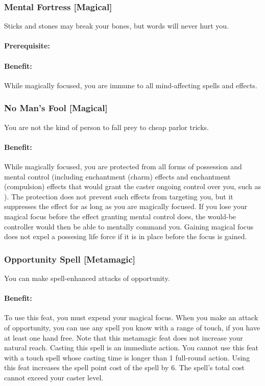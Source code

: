 \subsubsection[Mental Fortress]{Mental Fortress [Magical]}
\label{Feat:MentalFortress}
Sticks and stones may break your bones, but words will never hurt you.
\paragraph{Prerequisite:} 
\paragraph{Benefit:} While magically focused, you are immune to all mind-affecting spells and effects.
\subsubsection[No Man's Fool]{No Man's Fool [Magical]}
\label{Feat:NoMansFool}
You are not the kind of person to fall prey to cheap parlor tricks.
\paragraph{Benefit:} While magically focused, you are protected from all forms of possession and mental control (including enchantment (charm) effects and enchantment (compulsion) effects that would grant the caster ongoing control over you, such as ). 
The protection does not prevent such effects from targeting you, but it suppresses the effect for as long as you are magically focused. 
If you lose your magical focus before the effect granting mental control does, the would-be controller would then be able to mentally command you. 
Gaining magical focus does not expel a possesing life force if it is in place before the focus is gained. 
\subsubsection[Opportunity Spell]{Opportunity Spell [Metamagic]}
\label{Feat:OpportunitySpell}
You can make spell-enhanced attacks of opportunity.

\paragraph{Benefit:} To use this feat, you must expend your magical focus. 
When you make an attack of opportunity, you can use any spell you know with a range of touch, if you have at least one hand free.
Note that this metamagic feat does not increase your natural reach.
Casting this spell is an immediate action.
You cannot use this feat with a touch spell whose casting time is longer than 1 full-round action.
Using this feat increases the spell point cost of the spell by 6. The spell's total cost cannot exceed your caster level.

